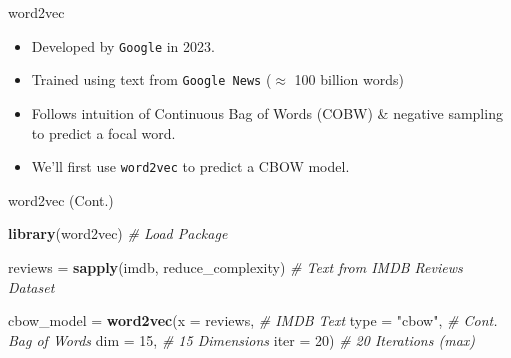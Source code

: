 \documentclass[
  ignorenonframetext,
  aspectratio=169]{beamer}
\newenvironment{Shaded}{\begin{snugshade}}{\end{snugshade}}
\newcommand{\AttributeTok}[1]{\textcolor[rgb]{0.13,0.29,0.53}{#1}}
\newcommand{\CommentTok}[1]{\textcolor[rgb]{0.56,0.35,0.01}{\textit{#1}}}
\newcommand{\DecValTok}[1]{\textcolor[rgb]{0.00,0.00,0.81}{#1}}
\newcommand{\FunctionTok}[1]{\textcolor[rgb]{0.13,0.29,0.53}{\textbf{#1}}}
\newcommand{\NormalTok}[1]{#1}
\newcommand{\OtherTok}[1]{\textcolor[rgb]{0.56,0.35,0.01}{#1}}
\newcommand{\StringTok}[1]{\textcolor[rgb]{0.31,0.60,0.02}{#1}}
\begin{document}
\begin{frame}{word2vec}
\label{word2vec}
\begin{itemize}
\item Developed by \texttt{Google} in 2023.  \par \vspace{2.5mm}
\item Trained using text from \texttt{Google News} ($\approx$ 100 billion words) \par \vspace{2.5mm}
\item Follows intuition of Continuous Bag of Words (COBW) \& negative sampling to predict a focal word.  \par \vspace{2.5mm}
\item We'll first use \texttt{word2vec} to predict a CBOW model. 
\end{itemize}
\end{frame}

\begin{frame}[fragile]{word2vec (Cont.)}
\label{word2vec-cont.}
\scriptsize

\begin{Shaded}
\begin{Highlighting}[]
\FunctionTok{library}\NormalTok{(word2vec) }\CommentTok{\# Load Package}

\NormalTok{reviews }\OtherTok{=} \FunctionTok{sapply}\NormalTok{(imdb, reduce\_complexity) }\CommentTok{\# Text from IMDB Reviews Dataset}

\NormalTok{cbow\_model }\OtherTok{=} \FunctionTok{word2vec}\NormalTok{(}\AttributeTok{x =}\NormalTok{ reviews, }\CommentTok{\# IMDB Text}
                      \AttributeTok{type =} \StringTok{"cbow"}\NormalTok{, }\CommentTok{\# Cont. Bag of Words }
                      \AttributeTok{dim =} \DecValTok{15}\NormalTok{, }\CommentTok{\# 15 Dimensions}
                      \AttributeTok{iter =} \DecValTok{20}\NormalTok{) }\CommentTok{\# 20 Iterations (max)}
\end{Highlighting}
\end{Shaded}
\end{frame}
\end{document}
